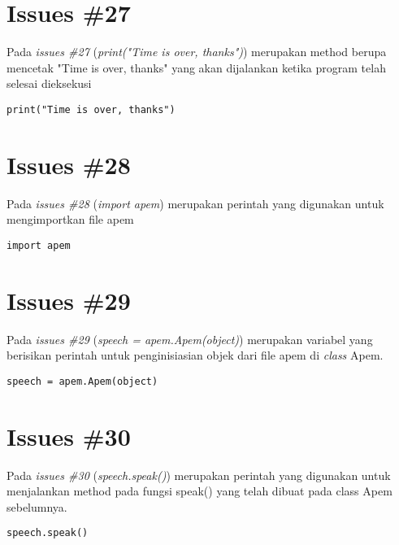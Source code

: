 \section{Issues \#27}
Pada \textit{issues \#27} (\textit{print("Time is over, thanks")}) merupakan method berupa mencetak "Time is over, thanks" yang akan dijalankan ketika program telah selesai dieksekusi
\begin{verbatim}
print("Time is over, thanks")
\end{verbatim}
\section{Issues \#28}
Pada \textit{issues \#28} (\textit{import apem}) merupakan perintah yang digunakan untuk mengimportkan file apem
\begin{verbatim}
import apem
\end{verbatim}
\section{Issues \#29}
Pada \textit{issues \#29} (\textit{speech = apem.Apem(object)}) merupakan variabel yang berisikan perintah untuk penginisiasian objek dari file apem di \textit{class} Apem.
\begin{verbatim}
speech = apem.Apem(object)
\end{verbatim}
\section{Issues \#30}
Pada \textit{issues \#30} (\textit{speech.speak()}) merupakan perintah yang digunakan untuk menjalankan method pada fungsi speak() yang telah dibuat pada class Apem sebelumnya.
\begin{verbatim}
speech.speak()
\end{verbatim}